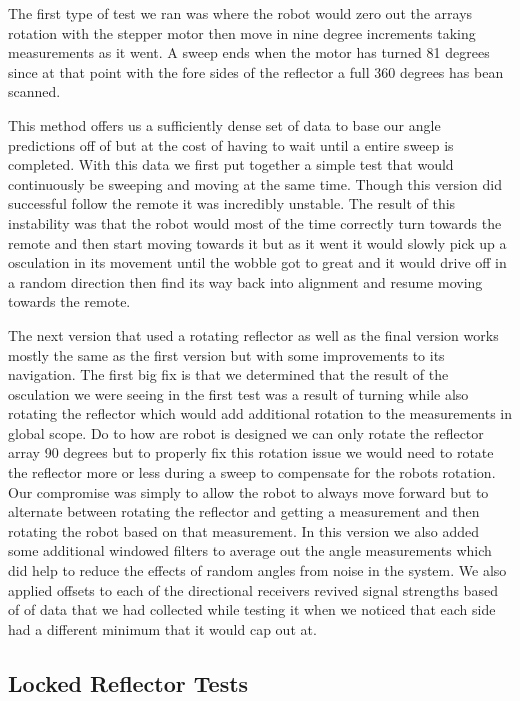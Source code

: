 The first type of test we ran was where the robot would zero out the arrays rotation with the stepper motor then move in nine degree increments taking measurements as it went. A sweep ends when the motor has turned 81 degrees since at that point with the fore sides of the reflector a full 360 degrees has bean scanned.\par
This method offers us a sufficiently dense set of data to base our angle predictions off of but at the cost of having to wait until a entire sweep is completed. With this data we first put together a simple test that would continuously be sweeping and moving at the same time. Though this version did successful follow the remote it was incredibly unstable.  The result of this instability was that the robot would most of the time correctly turn towards the remote and then start moving towards it but as it went it would slowly pick up a osculation in its movement until the wobble got to great and it would drive off in a random direction then find its way back into alignment and resume moving towards the remote.\par 
The next version that used a rotating reflector as well as the final version works mostly the same as the first version but with some improvements to its navigation.  The first big fix is that we determined that the result of the osculation we were seeing in the first test was a result of turning while also rotating the reflector which would add additional rotation to the measurements in global scope.  Do to how are robot is designed we can only rotate the reflector array 90 degrees but to properly fix this rotation issue we would need to rotate the reflector more or less during a sweep to compensate for the robots rotation. Our compromise was simply to allow the robot to always move forward but to alternate between rotating the reflector and getting a measurement and then rotating the robot based on that measurement.  In this version we also added some additional windowed filters to average out the angle measurements which did help to reduce the effects of random angles from noise in the system.  We also applied offsets to each of the directional receivers revived signal strengths based of of data that we had collected while testing it when we noticed that each side had a different minimum that it would cap out at.

\subsection{Locked Reflector Tests}

